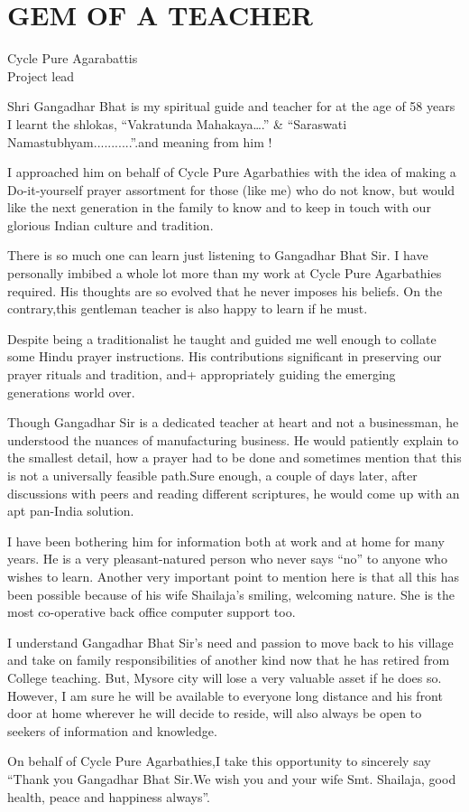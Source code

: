 \chapter{GEM OF A TEACHER}

\begin{center}
\smallskip
Cycle Pure Agarabattis\\
Project lead

\end{center}
Shri Gangadhar Bhat is my spiritual guide and teacher for at the age of 58 years I learnt the shlokas, “Vakratunda Mahakaya….” & “Saraswati Namastubhyam...........”.and meaning from him !

I approached him on behalf of Cycle Pure Agarbathies with the idea of making a Do-it-yourself prayer assortment for those (like me) who do not know, but would like the next generation in the family to know and to keep in touch with our glorious Indian culture and tradition.

There is so much one can learn just listening to Gangadhar Bhat Sir. I have personally imbibed a whole lot more than my work at Cycle Pure Agarbathies required. His thoughts are so evolved that he never imposes his beliefs. On the contrary,this gentleman teacher is also happy to learn if he must.

Despite being a traditionalist he taught and guided me well enough to collate some Hindu prayer instructions. His contributions significant in preserving our prayer rituals and tradition, and+ appropriately guiding the emerging generations world over.

Though Gangadhar Sir is a dedicated teacher at heart and not a businessman, he understood the nuances of manufacturing business. He would patiently explain to the smallest detail, how a prayer had to be done and sometimes mention that this is not a universally feasible path.Sure enough, a couple of days later, after discussions with peers and reading different scriptures, he would come up with an apt pan-India solution.

I have been bothering him for information both at work and at home for many years. He is a very pleasant-natured person who never says “no” to anyone who wishes to learn. Another very important point to mention here is that all this has been possible because of his wife Shailaja’s smiling, welcoming nature. She is the most co-operative back office computer support too. 

I understand Gangadhar Bhat Sir’s need and passion to move back to his village and take on family responsibilities of another kind now that he has retired from College teaching. But, Mysore city will lose a very valuable asset if he does so. However, I am sure he will be available to everyone long distance and his front door at home wherever he will decide to reside, will also always be open to seekers of information and knowledge.

On behalf of Cycle Pure Agarbathies,I take this opportunity to sincerely say “Thank you Gangadhar Bhat Sir.We wish you and your wife Smt. Shailaja, good health, peace and happiness always”.
